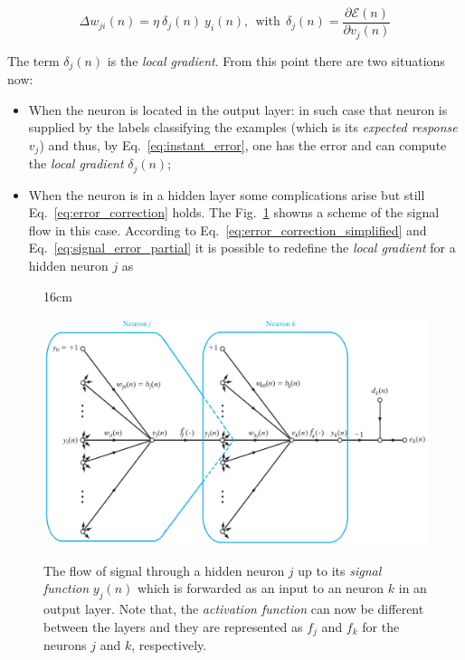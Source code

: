 \begin{equation}
\label{eq:error_correction_simplified}
\Delta w_{ji}(n) = \eta ~ \delta_{j}(n) ~ y_{i}(n), ~~\mathrm{with}~~\delta_{j}(n) = \frac{\partial \mathcal{E}(n)}{\partial v_{j}(n)}
\end{equation}

The term $\delta_{j}(n)$ is the \textit{local gradient}. From this point there are two situations now:
\begin{itemize}
\item [1] When the neuron is located in the output layer: in such case that neuron is supplied by the labels classifying the examples (which is its \textit{expected response} $v_{j}$) and thus, by Eq.~\ref{eq:instant_error}, one has the error and can compute the \textit{local gradient} $\delta_{j}(n)$;
\item [2] When the neuron is in a hidden layer some complications arise but still Eq.~\ref{eq:error_correction} holds. The Fig.~\ref{fig:hidden_neuronj_signal_flow} showns a scheme of the signal flow in this case. According to Eq.~\ref{eq:error_correction_simplified} and Eq.~\ref{eq:signal_error_partial} it is possible to redefine the \textit{local gradient} for a hidden neuron $j$ as

\end{itemize}
\begin{figure}[hbtp]{16cm}
	\caption{The flow of signal through a hidden neuron $j$ up to its \textit{signal function} $y_{j}(n)$ which is forwarded as an input to an neuron $k$ in an output layer. Note that, the \textit{activation function} can now be different between the layers and they are represented as $f_{j}$ and $f_{k}$ for the neurons $j$ and $k$, respectively.}
	\centering
	\includegraphics[scale=0.4]{ChapterAnalysis/figs/hidden_neuronj_signal_flow}
	\label{fig:hidden_neuronj_signal_flow}
\end{figure}


